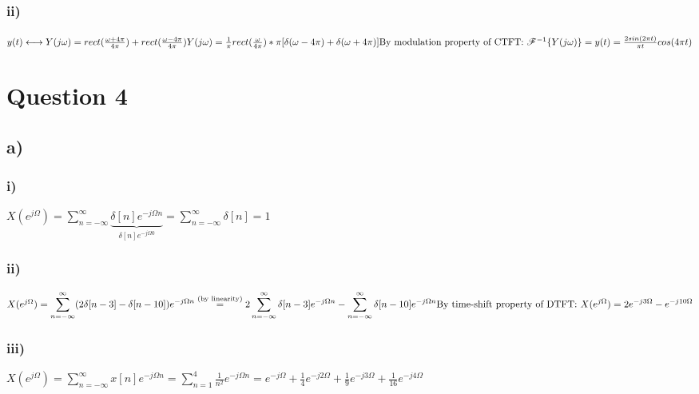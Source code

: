 \documentclass[12pt]{article}
\begin{document}
    \subsubsection*{ii)}
    \begin{math}
    y(t) \longleftrightarrow Y(j\omega) = rect(\frac{\omega+4\pi}{4\pi}) + rect(\frac{\omega-4\pi}{4\pi}) \\
    Y(j\omega) = \frac{1}{\pi} rect(\frac{\omega}{4\pi}) * \pi [\delta(\omega-4\pi) + \delta(\omega+4\pi)] \\
    \textrm{By modulation property of CTFT: } \\
    \mathscr{F}^{-1}\{Y(j\omega)\} = y(t) =  \frac{2sin(2\pi t)}{\pi t} cos(4\pi t) 
    \end{math} 
    \section*{Question 4}
    \subsection*{a)}
    \subsubsection*{i)}
    \begin{math} 
    X(e^{j\Omega}) = \displaystyle\sum_{n=-\infty}^{\infty} \underbrace{\delta[n] e^{-j\Omega n}}_{\delta[n] e^{-j\Omega 0}} = \displaystyle\sum_{n=-\infty}^{\infty} \delta[n] = 1 
    \end{math} 
     \subsubsection*{ii)}
    \begin{math} 
    X(e^{j\Omega}) = \displaystyle\sum_{n=-\infty}^{\infty} (2\delta[n-3] - \delta[n-10] ) e^{-j\Omega n} \stackrel{\text{(by linearity)}}{=} 2\displaystyle\sum_{n=-\infty}^{\infty} \delta[n-3] e^{-j\Omega n} - \displaystyle\sum_{n=-\infty}^{\infty} \delta[n-10] e^{-j\Omega n} \\ \\
    \textrm{By time-shift property of DTFT: } \\ 
    X(e^{j\Omega}) = 2e^{-j3\Omega} - e^{-j10\Omega} 
    \end{math} 
      \subsubsection*{iii)}
    \begin{math} 
    X(e^{j\Omega}) = \displaystyle\sum_{n=-\infty}^{\infty} x[n] e^{-j\Omega n} = \displaystyle\sum_{n=1}^{4} \frac{1}{n^{2}} e^{-j\Omega n} = e^{-j\Omega} + \frac{1}{4} e^{-j2\Omega} +\frac{1}{9} e^{-j3\Omega} + \frac{1}{16} e^{-j4\Omega}
    \end{math} 
\end{document}
